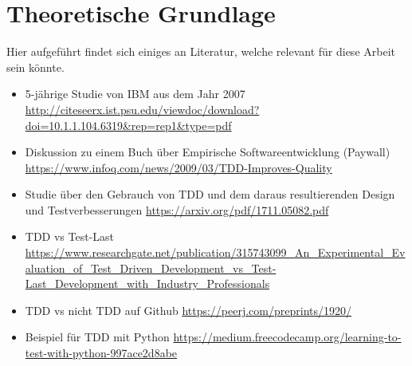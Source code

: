 \section{Theoretische Grundlage}
Hier aufgeführt findet sich einiges an Literatur, welche relevant für diese Arbeit
sein könnte.

\begin{itemize}
    \item 5-jährige Studie von IBM aus dem Jahr 2007
    \url{http://citeseerx.ist.psu.edu/viewdoc/download?doi=10.1.1.104.6319&rep=rep1&type=pdf}
    \item Diskussion zu einem Buch über Empirische Softwareentwicklung (Paywall)
    \url{https://www.infoq.com/news/2009/03/TDD-Improves-Quality}
    \item Studie über den Gebrauch von TDD und dem daraus resultierenden Design
    und Testverbesserungen
    \url{https://arxiv.org/pdf/1711.05082.pdf}
    \item TDD vs Test-Last
    \url{https://www.researchgate.net/publication/315743099_An_Experimental_Evaluation_of_Test_Driven_Development_vs_Test-Last_Development_with_Industry_Professionals}
    \item TDD vs nicht TDD auf Github
    \url{https://peerj.com/preprints/1920/}
    \item Beispiel für TDD mit Python
    \url{https://medium.freecodecamp.org/learning-to-test-with-python-997ace2d8abe}
\end{itemize}

